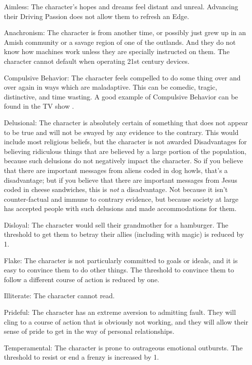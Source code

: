 \begin{description*}
\item[Aimless:] The character's hopes and dreams feel distant and unreal. Advancing their Driving Passion does not allow them to refresh an Edge.
\item[Anachronism:] The character is from another time, or possibly just grew up in an Amish community or a savage region of one of the outlands. And they do not know how machines work unless they are specially instructed on them. The character cannot default when operating 21st century devices.
\item[Compulsive Behavior:] The character feels compelled to do some thing over and over again in ways which are maladaptive. This can be comedic, tragic, distinctive, and time wasting. A good example of Compulsive Behavior can be found in the TV show .
\item[Delusional:] The character is absolutely certain of something that does not appear to be true and will not be swayed by any evidence to the contrary. This would include most religious beliefs, but the character is not awarded Disadvantages for believing ridiculous things that are believed by a large portion of the population, because such delusions do not negatively impact the character. So if you believe that there are important messages from aliens coded in dog howls, that's a disadvantage; but if you believe that there are important messages from Jesus coded in cheese sandwiches, this is \textit{not} a disadvantage. Not because it isn't counter-factual and immune to contrary evidence, but because society at large has accepted people with such delusions and made accommodations for them.
\item[Disloyal:] The character would sell their grandmother for a hamburger. The threshold to get them to betray their allies (including with magic) is reduced by 1.
\item[Flake:] The character is not particularly committed to goals or ideals, and it is easy to convince them to do other things. The threshold to convince them to follow a different course of action is reduced by one.
\item[Illiterate:] The character cannot read.
\item[Prideful:] The character has an extreme aversion to admitting fault. They will cling to a course of action that is obviously not working, and they will allow their sense of pride to get in the way of personal relationships.
\item[Temperamental:] The character is prone to outrageous emotional outbursts. The threshold to resist or end a frenzy is increased by 1.
\end{description*}

